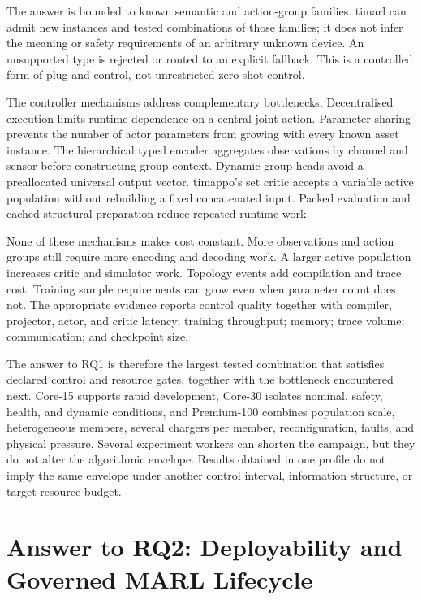 The answer is bounded to known semantic and action-group families. \gls{timarl} can admit new instances and tested combinations of those families; it does not infer the meaning or safety requirements of an arbitrary unknown device. An unsupported type is rejected or routed to an explicit fallback. This is a controlled form of plug-and-control, not unrestricted zero-shot control.

The controller mechanisms address complementary bottlenecks. Decentralised execution limits runtime dependence on a central joint action. Parameter sharing prevents the number of actor parameters from growing with every known asset instance. The hierarchical typed encoder aggregates observations by channel and sensor before constructing group context. Dynamic group heads avoid a preallocated universal output vector. \gls{timappo}'s set critic accepts a variable active population without rebuilding a fixed concatenated input. Packed evaluation and cached structural preparation reduce repeated runtime work.

None of these mechanisms makes cost constant. More observations and action groups still require more encoding and decoding work. A larger active population increases critic and simulator work. Topology events add compilation and trace cost. Training sample requirements can grow even when parameter count does not. The appropriate evidence reports control quality together with compiler, projector, actor, and critic latency; training throughput; memory; trace volume; communication; and checkpoint size.

The answer to RQ1 is therefore the largest tested combination that satisfies declared control and resource gates, together with the bottleneck encountered next. Core-15 supports rapid development, Core-30 isolates nominal, safety, health, and dynamic conditions, and Premium-100 combines population scale, heterogeneous members, several chargers per member, reconfiguration, faults, and physical pressure. Several experiment workers can shorten the campaign, but they do not alter the algorithmic envelope. Results obtained in one profile do not imply the same envelope under another control interval, information structure, or target resource budget.

\section{Answer to RQ2: Deployability and Governed MARL Lifecycle}
\label{sec:discussion-rq2}


